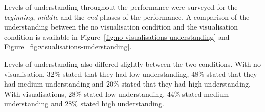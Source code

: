 Levels of understanding throughout the performance were surveyed for the \emph{beginning}, \emph{middle} and the \emph{end} phases of the performance. A comparison of the understanding between the no visualisation condition and the visualisation condition is available in Figure~\ref{fig:no-visualisations-understanding} and Figure~\ref{fig:visualisations-understanding}.

Levels of understanding also differed slightly between the two conditions. With no visualisation, $32\%$ stated that they had low understanding, $48\%$ stated that they had medium understanding and $20\%$ stated that they had high understanding. With visualisations, $28\%$ stated low understanding, $44\%$ stated medium understanding and $28\%$ stated high understanding.


